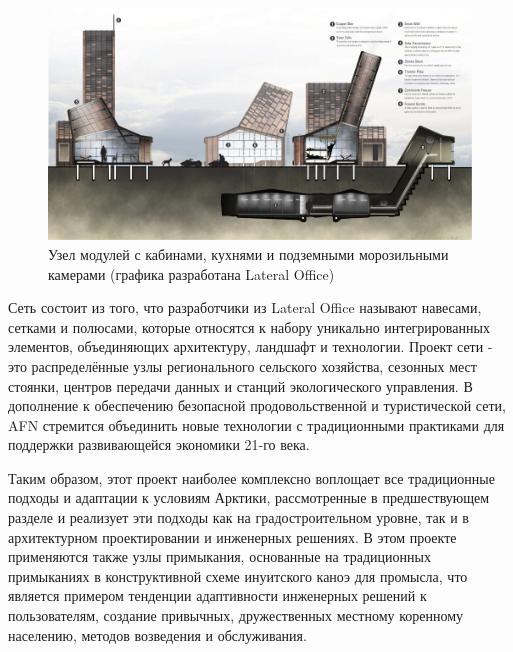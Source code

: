 \begin{figure}
    \centering
    \includegraphics[width=\textwidth]{assets/figures/ch01_s10_sci_AFN01_nodeSection.png}
    \caption{Узел модулей  с кабинами, кухнями и подземными морозильными камерами (графика разработана Lateral Office)}
    \label{fig:ch01_s10_sci_AFN01_nodeSection}
  \end{figure}

Сеть состоит из того, что разработчики из Lateral Office называют навесами, сетками и полюсами, которые относятся к набору уникально интегрированных элементов,
объединяющих архитектуру, ландшафт и технологии. Проект сети - это распределённые узлы регионального сельского хозяйства,
сезонных мест стоянки, центров передачи данных и станций экологического управления. В дополнение к обеспечению безопасной продовольственной и туристической сети,
AFN стремится объединить новые технологии с традиционными практиками для поддержки развивающейся экономики 21-го века.


Таким образом, этот проект наиболее комплексно воплощает все традиционные подходы и адаптации к условиям Арктики,
рассмотренные в предшествующем разделе и реализует эти подходы как на градостроительном уровне, так и в архитектурном проектировании и инженерных решениях.
В этом проекте применяются также узлы примыкания, основанные на традиционных примыканиях в конструктивной схеме инуитского каноэ для промысла,
что является примером тенденции адаптивности инженерных решений к пользователям, создание привычных, дружественных местному коренному населению, методов возведения и обслуживания.

